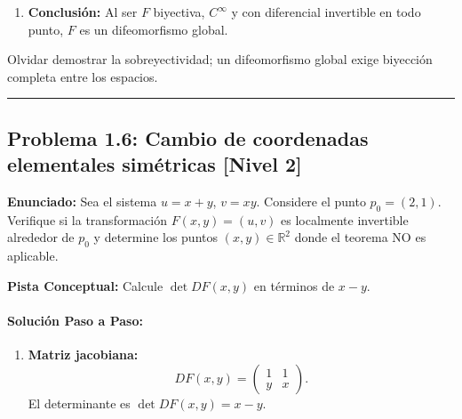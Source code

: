 \documentclass[11pt,a4paper]{article}
\begin{document}
\begin{enumerate}[label=\textbf{\arabic*.}]
\item \textbf{Conclusión:} Al ser $F$ biyectiva, $C^\infty$ y con diferencial invertible en todo punto, $F$ es un difeomorfismo global.
\end{enumerate}

\begin{trapbox}
Olvidar demostrar la sobreyectividad; un difeomorfismo global exige biyección completa entre los espacios.
\end{trapbox}

\vspace{0.5cm}
\hrule
\vspace{0.5cm}

\subsection*{Problema 1.6: Cambio de coordenadas elementales simétricas \hfill \color{primaryblue}\small[Nivel 2]}

\begin{tcolorbox}[colback=white,colframe=gray!40,arc=1mm,boxrule=0.5pt,left=3mm,right=3mm,top=2mm,bottom=2mm]
\textbf{Enunciado:} Sea el sistema $u = x + y$, $v = xy$. Considere el punto $p_0 = (2,1)$. Verifique si la transformación $F(x,y) = (u,v)$ es localmente invertible alrededor de $p_0$ y determine los puntos $(x,y) \in \mathbb{R}^2$ donde el teorema NO es aplicable.
\end{tcolorbox}

\begin{tcolorbox}[colback=yellow!4,colframe=accentamber!70,arc=1mm,boxrule=0.5pt,left=3mm,right=3mm,top=1.5mm,bottom=1.5mm]
\textbf{Pista Conceptual:} Calcule $\det DF(x,y)$ en términos de $x-y$.
\end{tcolorbox}

\paragraph{Solución Paso a Paso:}\par
\begin{enumerate}[label=\textbf{\arabic*.}]
\item \textbf{Matriz jacobiana:}
\begin{equation*}
DF(x,y) = \begin{pmatrix} 1 & 1 \\ y & x \end{pmatrix}.
\end{equation*}
El determinante es $\det DF(x,y) = x - y$.
\end{enumerate}
\end{document}
